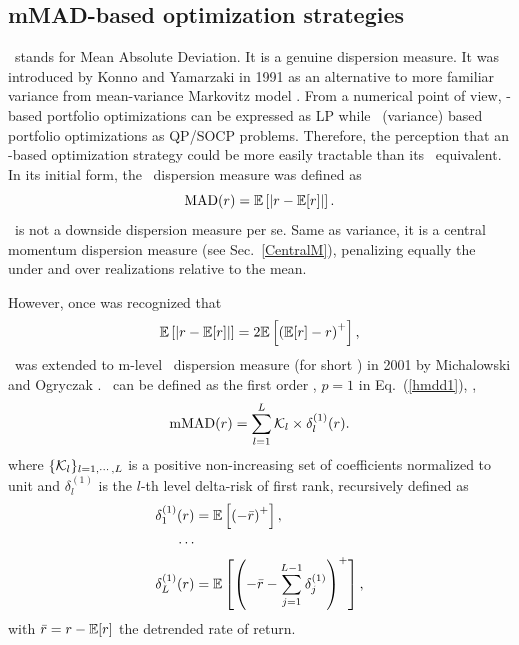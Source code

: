 
\subsection{mMAD-based optimization strategies}\label{S:mMAD}

\MAD\ stands for Mean Absolute Deviation. It is a genuine dispersion measure.
It was introduced by Konno and Yamarzaki in 1991 \cite{Konno} as an alternative to more familiar
variance from mean-variance Markovitz model \cite{Markowitz}.
From a numerical point of view, \MAD-based portfolio optimizations can be expressed as LP while
\MV\ (variance) based portfolio optimizations as QP/SOCP problems. Therefore, the perception that an \MAD-based optimization strategy could
be more easily tractable than its \MV\ equivalent.
In its initial form, the \MAD\ dispersion measure was defined as
\begin{equation}
    {\rm MAD}(r) = {\mathbb E}\left[ \left| r - {\mathbb E}[r]  \right| \right].
\end{equation}
\MAD\ is not a downside dispersion measure per se. Same as variance, it is a central momentum dispersion measure (see Sec.~\ref{CentralM}), penalizing equally the under and over
realizations relative to the mean.

However, once was recognized that
\begin{equation}
    {\mathbb E}\left[ \left| r - {\mathbb E}[r] \right| \right] = 2 {\mathbb E}\left[ \left( {\mathbb E}[r] - r \right)^+ \right],
\end{equation}
\MAD\ was extended to m-level \MAD\ dispersion measure (for short \mMAD) in 2001 by Michalowski and Ogryczak \cite{Ogryczak}.
\mMAD\ can be defined as the first order \mHMDD, $p=1$ in Eq.~(\ref{hmdd1}), \ie,
\begin{equation}
    \mMAD(r) = \sum_{l=1}^L \cK_l \times \delta^{(1)}_l(r).
    \label{mmad0}
\end{equation}
where $\{{\cal K}_l\}_{l=1,\cdots,L}$ is a positive non-increasing set of coefficients normalized to unit and
$\delta^{(1)}_l$ is the $l$-th level delta-risk of first rank, recursively defined as
\begin{align}
    \delta^{(1)}_1(r) &= \mE \left[ \left( -\br \right)^+ \right], \label{mmad02} \\
    \cdots & \nonumber \\
    \delta^{(1)}_L(r)  &= \mE \left[ \left( -\br - \sum_{j=1}^{L-1} \delta^{(1)}_j \right)^+ \right], \label{mmad01}
\end{align}
with ${\bar r} = r - {\mathbb E}[r]$ the detrended rate of return.

